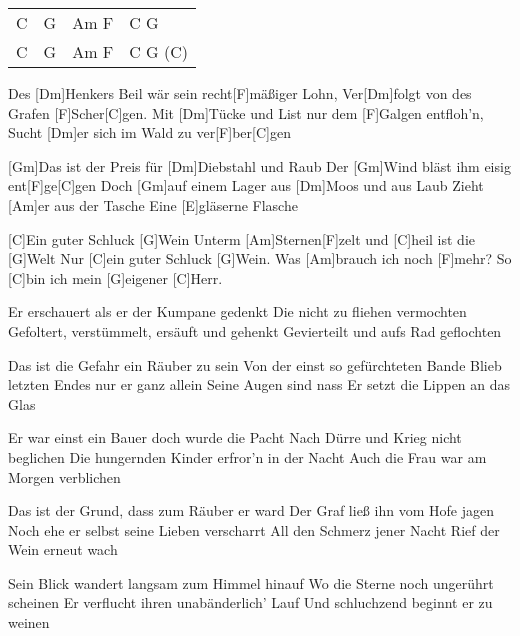 

\begin{guitar}
	 {\footnotesize\begin{tabular}{l|l|l|l}
			C & G & Am F & C G \\
			C & G & Am F & C G (C) 
	\end{tabular}}

	Des [Dm]Henkers Beil wär sein recht[F]mäßiger Lohn,
	Ver[Dm]folgt von des Grafen [F]Scher[C]gen.
	Mit [Dm]Tücke und List nur dem [F]Galgen entfloh'n,
	Sucht [Dm]er sich im Wald zu ver[F]ber[C]gen
	
	[Gm]Das ist der Preis für [Dm]Diebstahl und Raub
	Der [Gm]Wind bläst ihm eisig ent[F]ge[C]gen
	Doch [Gm]auf einem Lager aus [Dm]Moos und aus Laub
	Zieht [Am]er aus der Tasche
	Eine [E]gläserne Flasche
	
	[C]Ein guter Schluck [G]Wein
	Unterm [Am]Sternen[F]zelt und [C]heil ist die [G]Welt
	Nur [C]ein guter Schluck [G]Wein.
	Was [Am]brauch ich noch [F]mehr? So [C]bin ich mein [G]eigener [C]Herr.

	Er erschauert als er der Kumpane gedenkt
	Die nicht zu fliehen vermochten
	Gefoltert, verstümmelt, ersäuft und gehenkt
	Gevierteilt und aufs Rad geflochten

	Das ist die Gefahr ein Räuber zu sein
	Von der einst so gefürchteten Bande
	Blieb letzten Endes nur er ganz allein
	Seine Augen sind nass
	Er setzt die Lippen an das Glas
	
	 
	
	\pagebreak
	Er war einst ein Bauer doch wurde die Pacht
	Nach Dürre und Krieg nicht beglichen
	Die hungernden Kinder erfror'n in der Nacht
	Auch die Frau war am Morgen verblichen

	Das ist der Grund, dass zum Räuber er ward
	Der Graf ließ ihn vom Hofe jagen
	Noch ehe er selbst seine Lieben verscharrt
	All den Schmerz jener Nacht
	Rief der Wein erneut wach
	
	 

	Sein Blick wandert langsam zum Himmel hinauf
	Wo die Sterne noch ungerührt scheinen
	Er verflucht ihren unabänderlich' Lauf
	Und schluchzend beginnt er zu weinen
	

\end{guitar}
